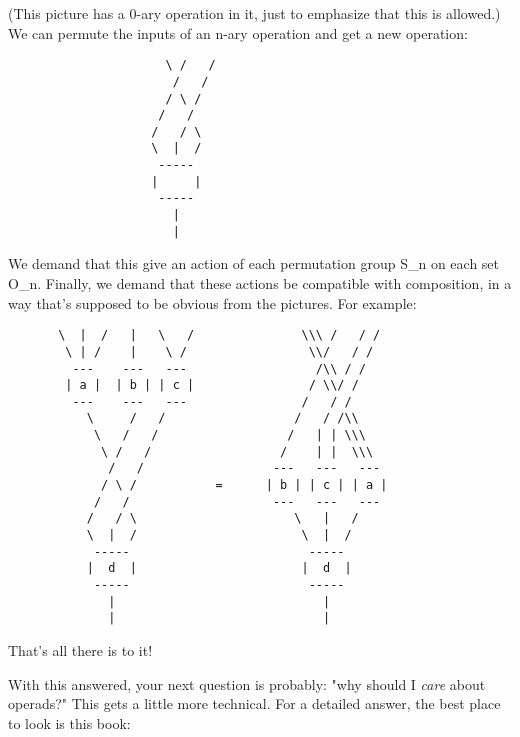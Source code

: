 (This picture has a 0-ary operation in it, just to emphasize
that this is allowed.)  We can permute the inputs of an n-ary 
operation and get a new operation:
                      
\begin{verbatim}
                      \ /   /
                       /   /
                      / \ /    
                     /   /   
                    /   / \
                    \  |  /
                     -----
                    |     | 
                     -----
                       |
                       |
\end{verbatim}
    
We demand that this give an action of each permutation group S_{n} 
on each set O_{n}.  Finally, we demand that these actions
be compatible with composition, in a way that's supposed to be
obvious from the pictures.   For example:


\begin{verbatim}
       \  |  /   |   \   /               \\\ /   / /
        \ | /    |    \ /                 \\/   / /
         ---    ---   ---                  /\\ / /
        | a |  | b | | c |                / \\/ /
         ---    ---   ---                /   / /
           \     /   /                  /   / /\\
            \   /   /                  /   | | \\\  
             \ /   /                  /    | |  \\\
              /   /                  ---   ---   ---
             / \ /           =      | b | | c | | a |
            /   /                    ---   ---   ---
           /   / \                      \   |   /
           \  |  /                       \  |  /
            -----                         -----
           |  d  |                       |  d  | 
            -----                         -----
              |                             |
              |                             |
\end{verbatim}
    
That's all there is to it!

With this answered, your next question is probably: "why should
I \emph{care} about operads?" This gets a little more technical.
For a detailed answer, the best place to look is this book:

